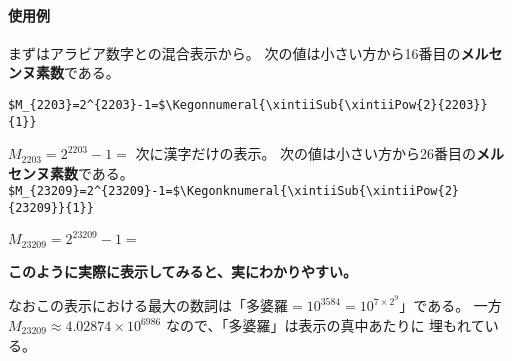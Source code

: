 \documentclass[dvipdfmx]{jsarticle}
\newif\ifSkipXint
\begin{document}
\paragraph{使用例}
まずはアラビア数字との混合表示から。
% 
% 
次の値は小さい方から16番目の\textbf{メルセンヌ素数}である。

\noindent\verb+$M_{2203}=2^{2203}-1=$\Kegonnumeral{\xintiiSub{\xintiiPow{2}{2203}}{1}}+
\par\noindent$M_{2203}=2^{2203}-1=$
\vfil
\noindent 次に漢字だけの表示。
次の値は小さい方から26番目の\textbf{メルセンヌ素数}である。
\newpage
\noindent\verb+$M_{23209}=2^{23209}-1=$\Kegonknumeral{\xintiiSub{\xintiiPow{2}{23209}}{1}}+
\par\noindent$M_{23209}=2^{23209}-1=$
\ifSkipXint
  \newread\MersenneFile \openin\MersenneFile=M23209.dat \read\MersenneFile to\TwentySixthMersennePrime \closein\MersenneFile
  \Kegonknumeral\TwentySixthMersennePrime
\else
\fi
\begin{center}\bfseries\large
このように実際に表示してみると、実にわかりやすい。
\end{center}
なおこの表示における最大の数詞は「$\text{多婆羅}=10^{3584}=10^{7\times2^9}$」である。
一方 $M_{23209}\approx 4.02874\times10^{6986}$ なので、「多婆羅」は表示の真中あたりに
埋もれている。
\end{document}
